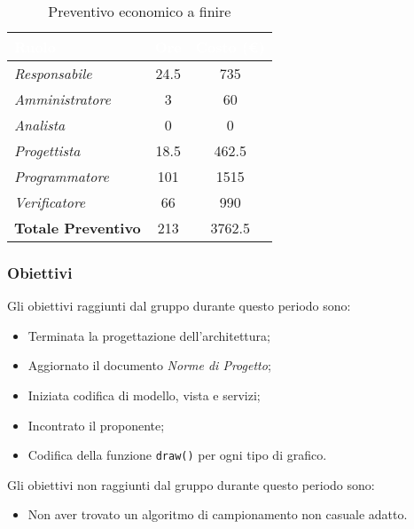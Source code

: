 \begin{table}[H]
    \renewcommand\arraystretch{1.5}
    \centering
    \begin{tabular}{|l|c|c|}
    \hline
    \rowcolor[HTML]{036400}
    \textcolor{white}{\textbf{Ruolo}} & \multicolumn{1}{l|}{\textcolor{white}{\textbf{Ore}}} & \multicolumn{1}{l|}{\textcolor{white}{\textbf{Costo (€)}}} \\ \hline
    \rowcolor[HTML]{EFEFEF}\textit{Responsabile}      & 24.5            & 735                 \\ \hline
    \rowcolor[HTML]{C0C0C0}\textit{Amministratore}    & 3               & 60                 \\ \hline
    \rowcolor[HTML]{EFEFEF}\textit{Analista}          & 0               & 0                 \\ \hline
    \rowcolor[HTML]{C0C0C0}\textit{Progettista}       & 18.5              & 462.5                 \\ \hline
    \rowcolor[HTML]{EFEFEF}\textit{Programmatore}     & 101             & 1515                 \\ \hline
    \rowcolor[HTML]{C0C0C0}\textit{Verificatore}      & 66              & 990                 \\ \hline
    \rowcolor[HTML]{EFEFEF}\textbf{Totale Preventivo} & 213           & 3762.5            \\ \hline
    \end{tabular}
    \caption{Preventivo economico a finire}
\end{table}

\subsubsection{Obiettivi}
Gli obiettivi raggiunti dal gruppo durante questo periodo sono:
\begin{itemize}
    \item Terminata la progettazione dell'architettura;
    \item Aggiornato il documento \textit{Norme di Progetto};
    \item Iniziata codifica di modello, vista e servizi;
    \item Incontrato il proponente;
    \item Codifica della funzione \texttt{draw()} per ogni tipo di grafico.
\end{itemize}
Gli obiettivi non raggiunti dal gruppo durante questo periodo sono:
\begin{itemize}
    \item Non aver trovato un algoritmo di campionamento non casuale adatto.
\end{itemize}

